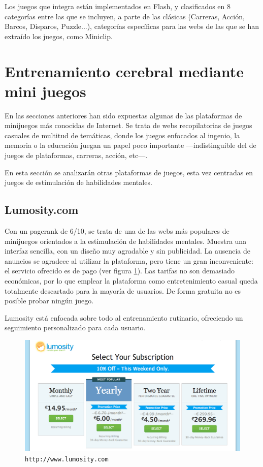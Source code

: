 Los juegos que integra están implementados en Flash, y clasificados en 8 categorías entre las que se incluyen, a parte de las clásicas (Carreras, Acción, Barcos, Disparos, Puzzle...), categorías específicas para las webs de las que se han extraído los juegos, como Miniclip.

\section{Entrenamiento cerebral mediante mini juegos}
\label{sec::webs-de-brain}

En las secciones anteriores han sido expuestas algunas de las plataformas de minijuegos más conocidas de Internet. Se trata de webs recopilatorias de juegos casuales de multitud de temáticas, donde los juegos enfocados al ingenio, la memoria o la educación juegan un papel poco importante ---indistinguible del de juegos de plataformas, carreras, acción, etc---.

En esta sección se analizarán otras plataformas de juegos, esta vez centradas en juegos de estimulación de habilidades mentales.

\subsection*{Lumosity.com}

Con un pagerank de 6/10, se trata de una de las webs más populares de minijuegos orientados a la estimulación de habilidades mentales. Muestra una interfaz sencilla, con un diseño muy agradable y sin publicidad. La ausencia de anuncios se agradece al utilizar la plataforma, pero tiene un gran inconveniente: el servicio ofrecido es de pago (ver figura \ref{fig::lumosity}). Las tarifas no son demasiado económicas, por lo que emplear la plataforma como entretenimiento casual queda totalmente descartado para la mayoría de usuarios. De forma gratuita no es posible probar ningún juego.

Lumosity está enfocada sobre todo al entrenamiento rutinario, ofreciendo un seguimiento personalizado para cada usuario.

\begin{figure}[h]
  \begin{center}
    \includegraphics[width=\textwidth]{images/lumosity.png}
    \caption{{\tt http://www.lumosity.com}}
    \label{fig::lumosity}
  \end{center}
\end{figure}


